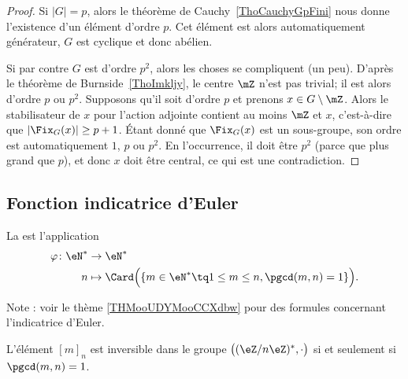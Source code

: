 \begin{proof}
	Si \( | G |=p\), alors le théorème de Cauchy~\ref{ThoCauchyGpFini} nous donne l'existence d'un élément d'ordre \( p\). Cet élément est alors automatiquement générateur, \( G\) est cyclique et donc abélien.

	Si par contre \( G\) est d'ordre \( p^2\), alors les choses se compliquent (un peu). D'après le théorème de Burnside~\ref{ThoImkljy}, le centre \( \mZ\) n'est pas trivial; il est alors d'ordre \( p\) ou \( p^2\). Supposons qu'il soit d'ordre \( p\) et prenons \( x\in G\setminus\mZ\). Alors le stabilisateur de \( x\) pour l'action adjointe contient au moins \( \mZ\) et \( x\), c'est-à-dire que \( |\Fix_G(x)|\geq p+1\). Étant donné que \( \Fix_G(x)\) est un sous-groupe, son ordre est automatiquement \( 1\), \( p\) ou \( p^2\). En l'occurrence, il doit être \( p^2\) (parce que plus grand que \( p\)), et donc \( x\) doit être central, ce qui est une contradiction.
\end{proof}



\subsection{Fonction indicatrice d'Euler}

\begin{definition}		\label{DEFooZRYMooZCozga}
	La  est l'application
	\begin{equation}
		\begin{aligned}
			\varphi\colon \eN^* & \to \eN^*                                                                    \\
			n                   & \mapsto \Card\Big(   \{ m\in \eN^*\tq 1\leq m\leq n, \pgcd(m,n)=1 \}  \Big).
		\end{aligned}
	\end{equation}
\end{definition}
Note : voir le thème \ref{THMooUDYMooCCXdbw} pour des formules concernant l'indicatrice d'Euler.

\begin{lemma}		\label{LEMooVGDHooStUaKH}
	L'élément \( [m]_n\) est inversible dans le groupe \( \big( (\eZ/n\eZ)^*,\cdot \big)\) si et seulement si \( \pgcd(m,n)=1\).
\end{lemma}

